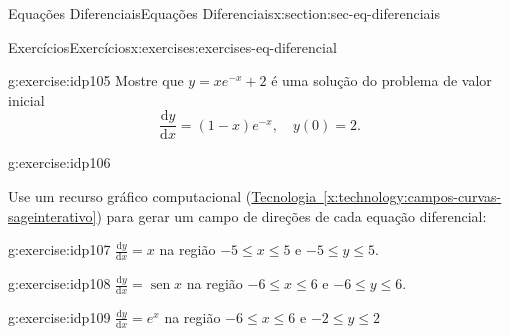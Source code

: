 \documentclass[oneside,10pt,]{article}
\newcommand{\xreffont}{\relax}
\numberwithin{equation}{section}
\newcommand{\dd}{\mathrm{d}}
\DeclareMathOperator{\sin}{sen}
\begin{document}
\begin{sectionptx}{Equações Diferenciais}{}{Equações Diferenciais}{}{}{x:section:sec-eq-diferenciais}
\begin{exercises-subsection}{Exercícios}{}{Exercícios}{}{}{x:exercises:exercises-eq-diferencial}
\begin{exercisegroup}
\end{exercisegroup}
\par\medskip\noindent
\begin{divisionexercise}{3}{}{}{g:exercise:idp105}%
Mostre que \(y=xe^{-x} + 2\) é uma solução do problema de valor inicial%
%
\begin{equation*}
\frac{\dd y}{\dd x} = (1-x)e^{-x}, \quad y(0)=2.
\end{equation*}
\end{divisionexercise}%
\begin{divisionexercise}{4}{}{}{g:exercise:idp106}%
\end{divisionexercise}%
\par\medskip\noindent%
%
Use um recurso gráfico computacional (\hyperref[x:technology:campos-curvas-sageinterativo]{Tecnologia~{\xreffont\ref{x:technology:campos-curvas-sageinterativo}}}) para gerar um campo de direções de cada equação diferencial:%
\begin{exercisegroup}
\begin{divisionexerciseeg}{5}{}{}{g:exercise:idp107}%
\(\frac{\dd y}{\dd x} = x\) na região \(−5 \leq x \leq 5\) e \(−5 \leq y \leq 5.\)%
\end{divisionexerciseeg}%
\begin{divisionexerciseeg}{6}{}{}{g:exercise:idp108}%
\(\frac{\dd y}{\dd x} = \sin{x}\) na região \(−6 \leq x \leq 6\) e \(−6 \leq y \leq 6.\)%
\end{divisionexerciseeg}%
\begin{divisionexerciseeg}{7}{}{}{g:exercise:idp109}%
\(\frac{\dd y}{\dd x} = e^x\) na região \(−6 \leq x \leq 6\) e \(−2 \leq y \leq 2\)%
\end{divisionexerciseeg}%
\end{exercisegroup}
\par\medskip\noindent
\end{exercises-subsection}
\end{sectionptx}
%
%
\typeout{************************************************}
\typeout{************************************************}
%
\end{document}
